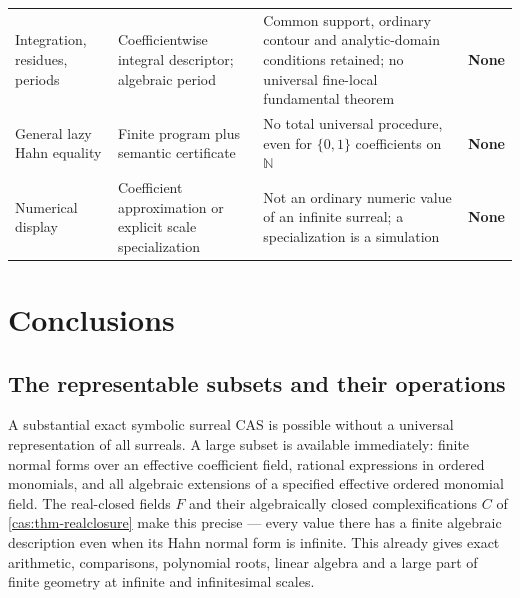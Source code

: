 \documentclass[11pt,letterpaper]{article}
\numberwithin{equation}{section}
\theoremstyle{definition}
\theoremstyle{remark}
\newcommand{\N}{\mathbb N}
\begin{document}
\begin{longtable}{@{}P{0.175\textwidth}P{0.235\textwidth}P{0.295\textwidth}P{0.205\textwidth}@{}}
Integration, residues, periods & Coefficientwise integral descriptor; algebraic
period & Common support, ordinary contour and analytic-domain conditions
retained; no universal fine-local fundamental theorem & \textbf{None}\\[0.35em]
General lazy Hahn equality & Finite program plus semantic certificate & No total
universal procedure, even for $\{0,1\}$ coefficients on $\N$ &
\textbf{None}\\[0.35em]
Numerical display & Coefficient approximation or explicit scale specialization &
Not an ordinary numeric value of an infinite surreal; a specialization is a
simulation & \textbf{None}\\
\bottomrule
\end{longtable}
\endgroup

\section{Conclusions}
\label{cas:sec-conclusions}

\subsection{The representable subsets and their operations}
\label{cas:sub-conclrep}
A substantial exact symbolic surreal CAS is possible without a universal
representation of all surreals. A large subset is available immediately: finite
normal forms over an effective coefficient field, rational expressions in
ordered monomials, and all algebraic extensions of a specified effective ordered
monomial field. The real-closed fields $F$ and their algebraically closed
complexifications $C$ of \cref{cas:thm-realclosure} make this precise --- every
value there has a finite algebraic description even when its Hahn normal form is
infinite. This already gives exact arithmetic, comparisons, polynomial roots,
linear algebra and a large part of finite geometry at infinite and infinitesimal
scales.
\end{document}
